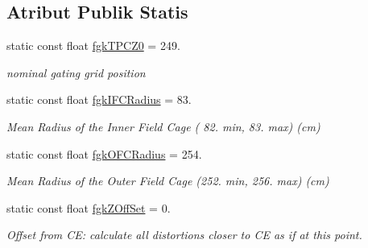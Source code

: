 \subsection*{Atribut Publik Statis}
\begin{DoxyCompactItemize}
\item 
\hypertarget{classPoissonSolver3DCylindricalGPU_a63ee7986eb68a318936a1ff5dcf1b374}{}\label{classPoissonSolver3DCylindricalGPU_a63ee7986eb68a318936a1ff5dcf1b374} 
static const float \hyperlink{classPoissonSolver3DCylindricalGPU_a63ee7986eb68a318936a1ff5dcf1b374}{fgk\+T\+P\+C\+Z0} = 249.
\begin{DoxyCompactList}\small\item\em nominal gating grid position \end{DoxyCompactList}\item 
static const float \hyperlink{classPoissonSolver3DCylindricalGPU_a6688ba03a837d4919001cd0aa14ef80e}{fgk\+I\+F\+C\+Radius} = 83.
\begin{DoxyCompactList}\small\item\em Mean Radius of the Inner Field Cage ( 82. min, 83. max) (cm) \end{DoxyCompactList}\item 
\hypertarget{classPoissonSolver3DCylindricalGPU_ac7da41dc5ec3589d855ae7569f34734d}{}\label{classPoissonSolver3DCylindricalGPU_ac7da41dc5ec3589d855ae7569f34734d} 
static const float \hyperlink{classPoissonSolver3DCylindricalGPU_ac7da41dc5ec3589d855ae7569f34734d}{fgk\+O\+F\+C\+Radius} = 254.
\begin{DoxyCompactList}\small\item\em Mean Radius of the Outer Field Cage (252. min, 256. max) (cm) \end{DoxyCompactList}\item 
\hypertarget{classPoissonSolver3DCylindricalGPU_afadd2484d1f621ff6424c9a007b67846}{}\label{classPoissonSolver3DCylindricalGPU_afadd2484d1f621ff6424c9a007b67846} 
static const float \hyperlink{classPoissonSolver3DCylindricalGPU_afadd2484d1f621ff6424c9a007b67846}{fgk\+Z\+Off\+Set} = 0.
\begin{DoxyCompactList}\small\item\em Offset from CE\+: calculate all distortions closer to CE as if at this point. \end{DoxyCompactList}\item 
\hypertarget{classPoissonSolver3DCylindricalGPU_a7f5bfebf7555b8d9182a1806170a3565}{}\label{classPoissonSolver3DCylindricalGPU_a7f5bfebf7555b8d9182a1806170a3565} 

\end{DoxyCompactItemize}
